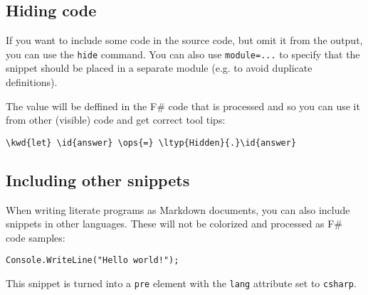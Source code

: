 \documentclass{article}
\newcommand{\id}[1]{\textcolor{black}{#1}}
\newcommand{\kwd}[1]{\textcolor{navy}{#1}}
\newcommand{\ops}[1]{\textcolor{purple}{#1}}
\begin{document}
\subsection*{Hiding code}



If you want to include some code in the source code,
but omit it from the output, you can use the \texttt{hide}
command. You can also use \texttt{module=...} to specify that
the snippet should be placed in a separate module
(e.g. to avoid duplicate definitions).


The value will be deffined in the F\# code that is
processed and so you can use it from other (visible)
code and get correct tool tips:
\begin{Verbatim}[commandchars=\\\{\}]
\kwd{let} \id{answer} \ops{=} \ltyp{Hidden}{.}\id{answer}

\end{Verbatim}

\subsection*{Including other snippets}



When writing literate programs as Markdown documents,
you can also include snippets in other languages.
These will not be colorized and processed as F\#
code samples:
\begin{lstlisting}
Console.WriteLine("Hello world!");

\end{lstlisting}


This snippet is turned into a \texttt{pre} element with the
\texttt{lang} attribute set to \texttt{csharp}.
\end{document}
